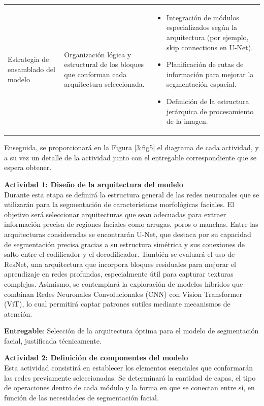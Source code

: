 \begin{longtable}{>{\raggedright\arraybackslash}p{4cm} >{\raggedright\arraybackslash}p{4cm} >{\raggedright\arraybackslash}p{5cm}}
 Estrategia de ensamblado del modelo & Organización lógica y estructural de los bloques que conforman cada arquitectura seleccionada. &
 \begin{itemize}
     \item Integración de módulos especializados según la arquitectura (por ejemplo, skip connections en U-Net).
     \item Planificación de rutas de información para mejorar la segmentación espacial.
     \item Definición de la estructura jerárquica de procesamiento de la imagen.
 \end{itemize} \\
 
 \end{longtable}
 \endgroup

 Enseguida, se proporcionará en la Figura \ref{3:fig5} el diagrama de cada actividad, y a su vez un detalle de la actividad junto con el entregable correspondiente que se espera obtener.
 
 \textbf{Actividad 1: Diseño de la arquitectura del modelo}
 \\
 Durante esta etapa se definirá la estructura general de las redes neuronales que se utilizarán para la segmentación de características morfológicas faciales. El objetivo será seleccionar arquitecturas que sean adecuadas para extraer información precisa de regiones faciales como arrugas, poros o manchas.
 Entre las arquitecturas consideradas se encontrarán U-Net, que destaca por su capacidad de segmentación precisa gracias a su estructura simétrica y sus conexiones de salto entre el codificador y el decodificador. También se evaluará el uso de ResNet, una arquitectura que incorpora bloques residuales para mejorar el aprendizaje en redes profundas, especialmente útil para capturar texturas complejas. Asimismo, se contemplará la exploración de modelos híbridos que combinan Redes Neuronales Convolucionales (CNN) con Vision Transformer (ViT), lo cual permitirá captar patrones sutiles mediante mecanismos de atención.
 
 \textbf{Entregable}: Selección de la arquitectura óptima para el modelo de segmentación facial, justificada técnicamente.

 \textbf{Actividad 2: Definición de componentes del modelo}
 \\
Esta actividad consistirá en establecer los elementos esenciales que conformarán las redes previamente seleccionadas. Se determinará la cantidad de capas, el tipo de operaciones dentro de cada módulo y la forma en que se conectan entre sí, en función de las necesidades de segmentación facial.

